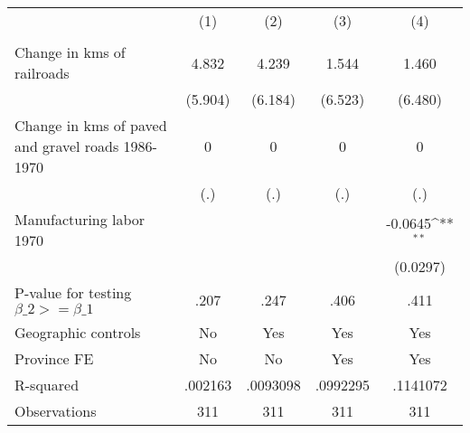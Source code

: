 {
\def\sym#1{\ifmmode^{#1}\else\(^{#1}\)\fi}
\begin{tabular}{l*{4}{c}}
\hline\hline
                &\multicolumn{1}{c}{(1)}&\multicolumn{1}{c}{(2)}&\multicolumn{1}{c}{(3)}&\multicolumn{1}{c}{(4)}\\
                &\multicolumn{1}{c}{}&\multicolumn{1}{c}{}&\multicolumn{1}{c}{}&\multicolumn{1}{c}{}\\
\hline
Change in kms of railroads&    4.832         &    4.239         &    1.544         &    1.460         \\
                &  (5.904)         &  (6.184)         &  (6.523)         &  (6.480)         \\
[1em]
Change in kms of paved and gravel roads 1986-1970&        0         &        0         &        0         &        0         \\
                &      (.)         &      (.)         &      (.)         &      (.)         \\
[1em]
Manufacturing labor 1970&                  &                  &                  &  -0.0645\sym{**} \\
                &                  &                  &                  & (0.0297)         \\
\hline
P-value for testing $\beta\_{2} >= \beta\_{1}$&     .207         &     .247         &     .406         &     .411         \\
Geographic controls&       No         &      Yes         &      Yes         &      Yes         \\
Province FE     &       No         &       No         &      Yes         &      Yes         \\
R-squared       &  .002163         & .0093098         & .0992295         & .1141072         \\
Observations    &      311         &      311         &      311         &      311         \\
\hline\hline
\end{tabular}
}
